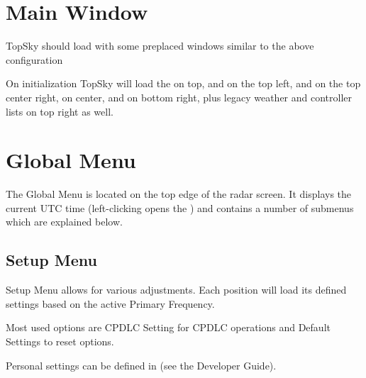 \documentclass[a4paper,oneside,11pt]{memoir}
\begin{document}
\section{Main Window}

TopSky should load with some preplaced windows similar to the above configuration


On initialization TopSky will load the  on top,  and  on the top left,  and  on the top center right,  on center,  and  on bottom right, plus legacy weather and controller lists on top right as well.

\section{Global Menu}
\label{menu:global}

The Global Menu is located on the top edge of the radar screen. It displays the current UTC time (left-clicking opens the ) and contains a number of submenus which are explained below.

\subsection{Setup Menu}
\label{menu:set}

Setup Menu allows for various adjustments. Each position will load its defined settings based on the active Primary Frequency.

Most used options are CPDLC Setting for CPDLC operations and Default Settings to reset options.

Personal settings can be defined in \texttt{} (see the Developer Guide).
\end{document}
